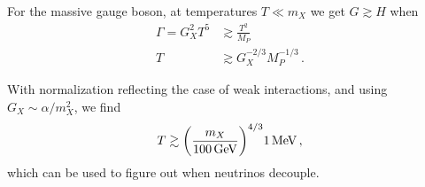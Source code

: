 \documentclass[main.tex]{subfiles}
\begin{document}
For the massive gauge boson, at temperatures \(T \ll m_X\) we get \(G \gtrsim H\) when 
%
\begin{align}
\Gamma = G_X^2 T^{5} &\gtrsim \frac{T^2}{M_P}  \\
T &\gtrsim G_X^{-2/3} M_P^{-1/3}
\,.
\end{align}

With normalization reflecting the case of weak interactions, and using \(G_X \sim \alpha / m_X^2\), we find 
%
\begin{align}
T \gtrsim \qty(\frac{m_X}{\SI{100}{GeV}})^{4/3} \SI{1}{MeV}
\,,
\end{align}
%
which can be used to figure out when neutrinos decouple. 
\end{document}
